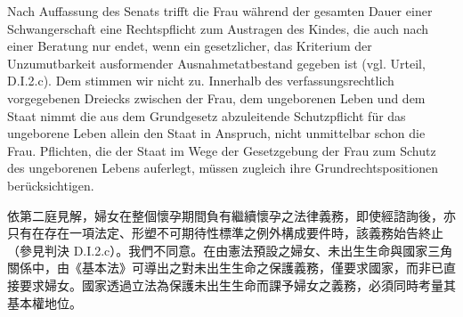 \documentclass[12pt]{article}
\begin{document}
\begin{sourcepara}[title={原文SondervotumMS.272}]
Nach Auffassung des Senats trifft die Frau während der gesamten Dauer einer Schwangerschaft eine Rechtspflicht zum Austragen des Kindes, die auch nach einer Beratung nur endet, wenn ein gesetzlicher, das Kriterium der Unzumutbarkeit ausformender Ausnahmetatbestand gegeben ist (vgl. Urteil, D.I.2.c). Dem stimmen wir nicht zu. Innerhalb des verfassungsrechtlich vorgegebenen Dreiecks zwischen der Frau, dem ungeborenen Leben und dem Staat nimmt die aus dem Grundgesetz abzuleitende Schutzpflicht für das ungeborene Leben allein den Staat in Anspruch, nicht unmittelbar schon die Frau. Pflichten, die der Staat im Wege der Gesetzgebung der Frau zum Schutz des ungeborenen Lebens auferlegt, müssen zugleich ihre Grundrechtspositionen berücksichtigen.
\end{sourcepara}
\begin{transpara}
依第二庭見解，婦女在整個懷孕期間負有繼續懷孕之法律義務，即使經諮詢後，亦只有在存在一項法定、形塑不可期待性標準之例外構成要件時，該義務始告終止（參見判決 D.I.2.c）。我們不同意。在由憲法預設之婦女、未出生生命與國家三角關係中，由《基本法》可導出之對未出生生命之保護義務，僅要求國家，而非已直接要求婦女。國家透過立法為保護未出生生命而課予婦女之義務，必須同時考量其基本權地位。
\end{transpara}
\end{document}
